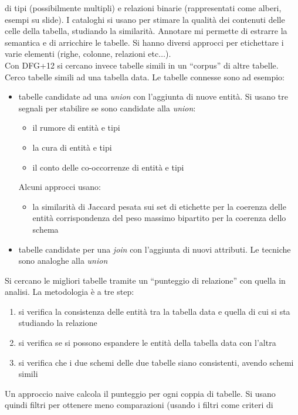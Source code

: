 \documentclass[a4paper,12pt, oneside]{book}
\begin{document}
\begin{itemize}
  di tipi (possibilmente multipli) e relazioni binarie (rappresentati come
  alberi, esempi su slide). I cataloghi si usano per stimare la qualità dei
  contenuti delle celle della tabella, studiando la similarità. Annotare mi
  permette di estrarre la semantica e di arricchire le tabelle. Si hanno diversi
  approcci per etichettare i varie elementi (righe, colonne, relazioni
  etc$\ldots$). \\
  Con DFG+12 si cercano invece tabelle simili in un ``corpus'' di altre
  tabelle. Cerco tabelle simili ad una tabella data. Le tabelle connesse sono ad
  esempio: 
  \begin{itemize}
    \item tabelle candidate ad una \textit{union} con l'aggiunta di nuove
    entità.
    Si usano tre segnali per stabilire se sono candidate alla \textit{union}:
  \begin{itemize}
    \item il rumore di entità e tipi
    \item la cura di entità e tipi
    \item il conto delle co-occorrenze di entità e tipi
  \end{itemize}
  Alcuni approcci usano:
  \begin{itemize}
    \item la similarità di Jaccard pesata sui set di etichette per la coerenza
    delle entità corrispondenza del peso massimo bipartito per la coerenza dello
    schema 
  \end{itemize}
    \item tabelle candidate per una \textit{join} con l'aggiunta di nuovi
    attributi. Le tecniche sono analoghe alla \textit{union}
  \end{itemize}
  Si cercano le migliori tabelle tramite un ``punteggio di relazione'' con
  quella in analisi. La metodologia è a tre step:
  \begin{enumerate}
    \item si verifica la consistenza delle entità tra la tabella data e quella
    di cui si sta studiando la relazione
    \item si verifica se si possono espandere le entità della tabella data con
    l'altra
    \item si verifica che i due schemi delle due tabelle siano consistenti,
    avendo schemi simili
  \end{enumerate}
  Un approccio naive calcola il punteggio per ogni coppia di tabelle. Si usano
  quindi filtri per ottenere meno comparazioni (usando i filtri come criteri di

\end{itemize}
\end{document}

